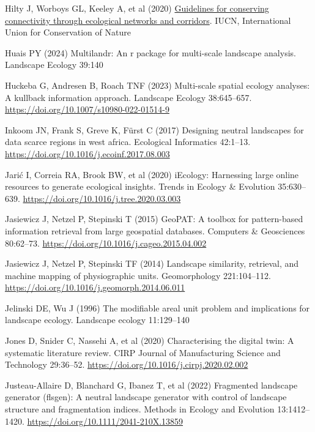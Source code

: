 \documentclass[
  10pt,
  a4paperpaper,
]{article}
\newlength{\cslhangindent}
\newenvironment{CSLReferences}[2] %
 {\begin{list}{}{%
  \setlength{\itemindent}{0pt}
  \setlength{\leftmargin}{0pt}
  \setlength{\parsep}{0pt}
  \ifodd #1
   \setlength{\leftmargin}{\cslhangindent}
   \setlength{\itemindent}{-1\cslhangindent}
  \fi
  \setlength{\itemsep}{#2\baselineskip}}}
 {\end{list}}
\begin{document}
\begin{CSLReferences}{1}{1}
Hilty J, Worboys GL, Keeley A, et al (2020)
\href{https://doi.org/10.2305/IUCN.CH.2020.PAG.30.en}{Guidelines for
conserving connectivity through ecological networks and corridors}.
IUCN, International Union for Conservation of Nature

Huais PY (2024) Multilandr: An r package for multi-scale landscape
analysis. Landscape Ecology 39:140

Huckeba G, Andresen B, Roach TNF (2023) Multi-scale spatial ecology
analyses: A kullback information approach. Landscape Ecology
38:645--657. \url{https://doi.org/10.1007/s10980-022-01514-9}

Inkoom JN, Frank S, Greve K, Fürst C (2017) Designing neutral landscapes
for data scarce regions in west africa. Ecological Informatics 42:1--13.
\url{https://doi.org/10.1016/j.ecoinf.2017.08.003}

Jarić I, Correia RA, Brook BW, et al (2020) iEcology: Harnessing large
online resources to generate ecological insights. Trends in Ecology \&
Evolution 35:630--639. \url{https://doi.org/10.1016/j.tree.2020.03.003}

Jasiewicz J, Netzel P, Stepinski T (2015) GeoPAT: A toolbox for
pattern-based information retrieval from large geospatial databases.
Computers \& Geosciences 80:62--73.
\url{https://doi.org/10.1016/j.cageo.2015.04.002}

Jasiewicz J, Netzel P, Stepinski TF (2014) Landscape similarity,
retrieval, and machine mapping of physiographic units. Geomorphology
221:104--112. \url{https://doi.org/10.1016/j.geomorph.2014.06.011}

Jelinski DE, Wu J (1996) The modifiable areal unit problem and
implications for landscape ecology. Landscape ecology 11:129--140

Jones D, Snider C, Nassehi A, et al (2020) Characterising the digital
twin: A systematic literature review. CIRP Journal of Manufacturing
Science and Technology 29:36--52.
\url{https://doi.org/10.1016/j.cirpj.2020.02.002}

Justeau-Allaire D, Blanchard G, Ibanez T, et al (2022) Fragmented
landscape generator (flsgen): A neutral landscape generator with control
of landscape structure and fragmentation indices. Methods in Ecology and
Evolution 13:1412--1420. \url{https://doi.org/10.1111/2041-210X.13859}


\end{CSLReferences}
\end{document}
